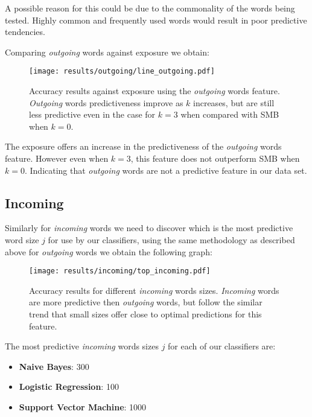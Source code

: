 A possible reason for this could be due to the commonality of the words being tested. Highly common and frequently used words would 
result in poor predictive tendencies.

\clearpage

Comparing \emph{outgoing} words against exposure we obtain:

\begin{figure}[h]
	\begin{center}
		\texttt{[image: results/outgoing/line\_outgoing.pdf]}
		\caption{Accuracy results against exposure using the \emph{outgoing} words feature. \emph{Outgoing} words predictiveness improve as $k$ increases, but are still less predictive
				 even in the case for $k=3$ when compared with SMB when $k=0$.}
	\end{center}
\end{figure}

The exposure offers an increase in the predictiveness of the \emph{outgoing} words feature. However even when $k=3$, this feature does 
not outperform SMB when $k=0$. Indicating that \emph{outgoing} words are not a predictive feature in our data set.

\subsection{Incoming}
\label{sec:id}

Similarly for \emph{incoming} words we need to discover which is the most predictive word size $j$ for use by our classifiers, 
using the same methodology as described above for \emph{outgoing} words we obtain the following graph:

\begin{figure}[h]
	\begin{center}
		\texttt{[image: results/incoming/top\_incoming.pdf]}
		\caption{Accuracy results for different \emph{incoming} words sizes. \emph{Incoming} words are more predictive then \emph{outgoing} words, but follow
				 the similar trend that small sizes offer close to optimal predictions for this feature.}
	\end{center}
\end{figure}

The most predictive \emph{incoming} words sizes $j$ for each of our classifiers are:
\begin{itemize}
\item \textbf{Naive Bayes}: 300
\item \textbf{Logistic Regression}: 100
\item \textbf{Support Vector Machine}: 1000
\end{itemize}


